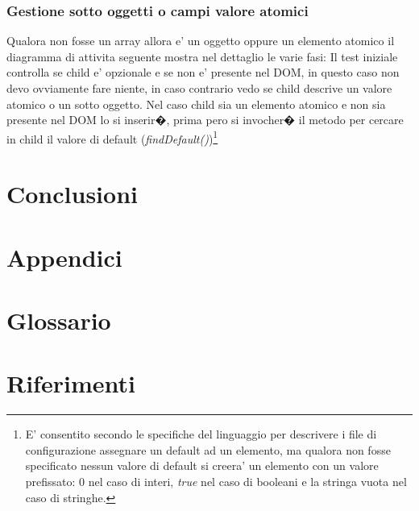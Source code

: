 \documentclass[11pt,titlepage,a4paper,twoside,openany]{book}
\begin{document}
\subsection{Gestione sotto oggetti o campi valore atomici}
Qualora non fosse un array allora e' un oggetto oppure un elemento atomico il diagramma di attivita seguente mostra nel dettaglio le varie fasi:
Il test iniziale controlla se child e' opzionale e se non e' presente nel DOM, in questo caso non devo ovviamente fare niente, in caso contrario vedo se child descrive un valore atomico o un sotto oggetto.
Nel caso child sia un elemento atomico e non sia presente nel DOM lo si inserir�, prima pero si invocher� il metodo per cercare in child il valore di default (\textit{findDefault()})\footnote[2]{E' consentito secondo le specifiche del linguaggio per descrivere i file di configurazione assegnare un default ad un elemento, ma qualora non fosse specificato nessun valore di default si creera' un elemento con un valore prefissato: 0 nel caso di interi, \textit{true} nel caso di booleani e la stringa vuota nel caso di stringhe.}

\chapter{Conclusioni}
\chapter{Appendici}
\chapter{Glossario}
\chapter{Riferimenti}
\end{document}
